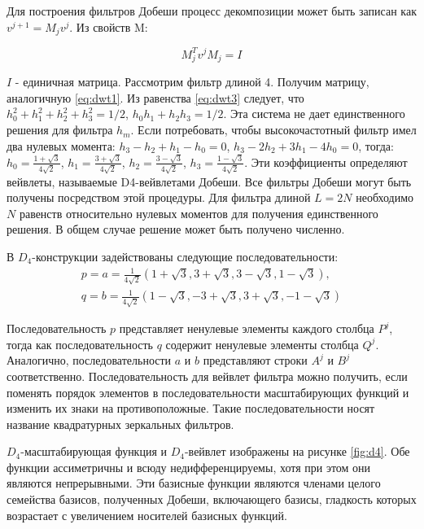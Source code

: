 Для построения фильтров Добеши процесс декомпозиции может быть записан как $v^{j+1}=M_{j}v^{j}$. Из свойств M:

\begin{equation}\label{eq:dwt3}
M_{j}^{T}v^{j} M_{j} = I
\end{equation}

$I$ - единичная матрица. Рассмотрим фильтр длиной 4. Получим матрицу, аналогичную \ref{eq:dwt1}. Из равенства \ref{eq:dwt3} следует, что 
$h_{0}^{2} + h_{1}^{2} + h_{2}^{2} + h_{3}^{2} = 1/2$, $h_{0}h_{1} + h_{2}h_{3} = 1/2$.
Эта система не дает единственного решения для фильтра $h_{m}$. Если потребовать, чтобы высокочастотный фильтр имел два нулевых момента:
$h_{3} - h_{2} + h_{1} - h_{0} = 0$, $h_{3} - 2h_{2} + 3h_{1} - 4h_{0} = 0$,
тогда: $h_{0} = \frac{1+\sqrt{3}}{4\sqrt{2}}$, $h_{1} = \frac{3+\sqrt{3}}{4\sqrt{2}}$, $h_{2} = \frac{3-\sqrt{3}}{4\sqrt{2}}$, $h_{3} = \frac{1-\sqrt{3}}{4\sqrt{2}}$.
Эти коэффициенты определяют вейвлеты, называемые D4-вейвлетами Добеши. 
Все фильтры Добеши могут быть получены посредством этой процедуры. 
Для фильтра длиной $L=2N$ необходимо $N$ равенств относительно нулевых моментов для получения единственного решения. 
В общем случае решение может быть получено численно. 

В $D_{4}$-конструкции задействованы следующие последовательности:
\begin{equation}
\begin{split}
 p=a=\frac{1}{4\sqrt{2}}(1+\sqrt{3}, 3+\sqrt{3}, 3-\sqrt{3}, 1-\sqrt{3}), \\
 q=b=\frac{1}{4\sqrt{2}}(1-\sqrt{3}, -3+\sqrt{3}, 3+\sqrt{3}, -1-\sqrt{3})
 \end{split}
\end{equation}

Последовательность $p$ представляет ненулевые элементы каждого столбца $P^{j}$, тогда как последовательность $q$ содержит ненулевые 
элементы столбца $Q^{j}$. Аналогично, последовательности $a$ и $b$ представляют строки $A^{j}$ и $B^{j}$ соответственно.
Последовательность для вейвлет фильтра можно получить, если поменять порядок элементов в последовательности масштабирующих функций 
и изменить их знаки на противоположные. Такие последовательности носят название квадратурных зеркальных фильтров.

$D_{4}$-масштабирующая функция и $D_{4}$-вейвлет изображены на рисунке \ref{fig:d4}. Обе функции ассиметричны и всюду недифференцируемы,
хотя при этом они являются непрерывными. Эти базисные функции являются членами целого семейства базисов, полученных Добеши,
включающего базисы, гладкость которых возрастает с увеличением носителей базисных функций.

